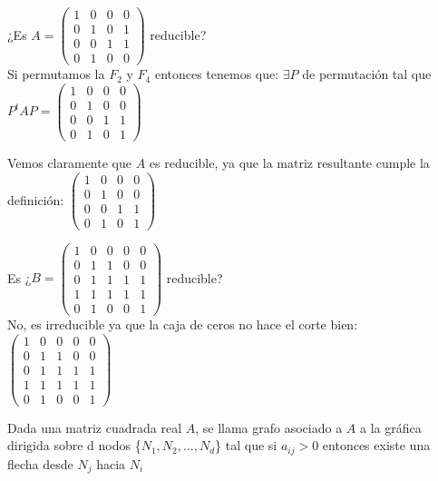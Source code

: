 \begin{ejemplo}
¿Es $A =
\begin{pmatrix}
1 & 0 & 0 & 0 \\
0 & 1 & 0 & 1 \\
0 & 0 & 1 & 1 \\
0 & 1 & 0 & 0
\end{pmatrix}
$ reducible? \\
Si permutamos la $F_{2}$ y $F_{4}$ entonces tenemos que: $\exists P$ de permutación tal que $P^{t}AP =
\begin{pmatrix}
1 & 0 & 0 & 0 \\
0 & 1 & 0 & 0 \\
0 & 0 & 1 & 1 \\
0 & 1 & 0 & 1
\end{pmatrix}$

Vemos claramente que $A$ es reducible, ya que la matriz resultante cumple la definición:
$\left( \begin{array}{cc|cc}
	1 & 0 & 0 & 0 \\
	0 & 1 & 0 & 0 \\
	\hline
	0 & 0 & 1 & 1 \\
	0 & 1 & 0 & 1
 \end{array}\right)$
\end{ejemplo}

\begin{ejemplo}
Es ¿$B =
\begin{pmatrix}
1 & 0 & 0 & 0 & 0 \\
0 & 1 & 1 & 0 & 0 \\
0 & 1 & 1 & 1 & 1 \\
1 & 1 & 1 & 1 & 1 \\
0 & 1 & 0 & 0 & 1
\end{pmatrix}$ reducible? \\
No, es irreducible ya que la caja de ceros no hace el corte bien:
$\left( \begin{array}{ccc|cc}
	1 & 0 & 0 & 0 & 0 \\
	0 & 1 & 1 & 0 & 0 \\
	\hline
	0 & 1 & 1 & 1 & 1 \\
	1 & 1 & 1 & 1 & 1 \\
	0 & 1 & 0 & 0 & 1
 \end{array}\right)$
\end{ejemplo}

\begin{ndef}
	Dada una matriz cuadrada real $A$, se llama grafo asociado a $A$ a la gráfica dirigida sobre d nodos \{$N_{1},N_{2},...,N_{d}$\} tal que si $a_{ij}>0$ entonces existe una flecha desde $N_{j}$ hacia $N_{i}$
\end{ndef}

